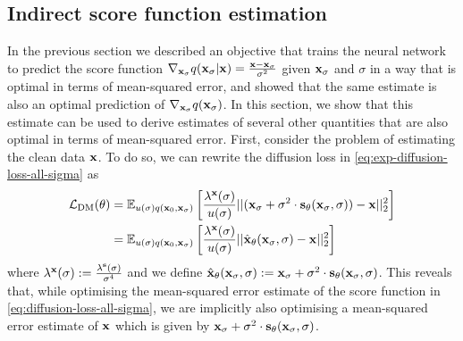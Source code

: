 \subsection{Indirect score function estimation} \label{eq:diffusion-equivalent-parameterisations}
In the previous section we described an objective that trains the neural network to predict the score function $\nabla_{{\mathbf{x}}_\sigma} q({\mathbf{x}}_\sigma|{\mathbf{x}}) = \frac{{\mathbf{x}}-{\mathbf{x}}_\sigma}{\sigma^2}$ given ${\mathbf{x}}_\sigma$ and $\sigma$ in a way that is optimal in terms of mean-squared error, and showed that the same estimate is also an optimal prediction of $\nabla_{{\mathbf{x}}_\sigma} q({\mathbf{x}}_\sigma)$. In this section, we show that this estimate can be used to derive estimates of several other quantities that are also optimal in terms of mean-squared error. First, consider the problem of estimating the clean data ${\mathbf{x}}$. To do so, we can rewrite the diffusion loss in \cref{eq:exp-diffusion-loss-all-sigma} as
\begin{align} \label{eq:x0-diffusion-loss}
    \mathcal{L}_\text{DM}(\theta) &= \mathbb{E}_{u(\sigma)q({\mathbf{x}}_0, {\mathbf{x}}_\sigma)} \left[ \frac{\lambda^{\mathbf{x}}(\sigma)}{u(\sigma)}
    || ({\mathbf{x}}_\sigma + \sigma^2 \cdot {\mathbf{s}}_\theta({\mathbf{x}}_\sigma, \sigma)) - {\mathbf{x}} ||_2^2 \right] \\
    &= \mathbb{E}_{u(\sigma)q({\mathbf{x}}_0, {\mathbf{x}}_\sigma)} \left[ 
    \frac{\lambda^{\mathbf{x}}(\sigma)}{u(\sigma)}
    || \hat{{\mathbf{x}}}_\theta({\mathbf{x}}_\sigma, \sigma) - {\mathbf{x}} ||_2^2 \right]
\end{align}
where $\lambda^{\mathbf{x}}(\sigma) := \frac{\lambda^{\mathbf{s}}(\sigma)}{\sigma^4}$ and we define $\hat{{\mathbf{x}}}_\theta({\mathbf{x}}_\sigma, \sigma) := {\mathbf{x}}_\sigma + \sigma^2 \cdot {\mathbf{s}}_\theta({\mathbf{x}}_\sigma, \sigma)$. This reveals that, while optimising the mean-squared error estimate of the score function in \cref{eq:diffusion-loss-all-sigma}, we are implicitly also optimising a mean-squared error estimate of ${\mathbf{x}}$ which is given by ${\mathbf{x}}_\sigma + \sigma^2 \cdot {\mathbf{s}}_\theta({\mathbf{x}}_\sigma, \sigma)$.

